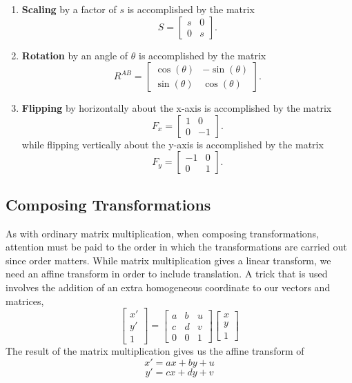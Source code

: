 \documentclass[11pt]{article}
\theoremstyle{plain} %
\theoremstyle{definition}
\theoremstyle{example}
\theoremstyle{remark}
\begin{document}
\begin{enumerate}
	\item \textbf{Scaling} by a factor of $s$ is accomplished by the matrix $$S = \begin{bmatrix}s & 0 \\ 0 & s\end{bmatrix}.$$
	\item \textbf{Rotation} by an angle of $\theta$ is accomplished by the matrix $$R^{AB} = \begin{bmatrix}\cos(\theta) & -\sin(\theta)\\ \sin(\theta) & \cos(\theta)\end{bmatrix}.$$
	\item \textbf{Flipping} by horizontally about the x-axis is accomplished by the matrix $$F_x = \begin{bmatrix}1 & 0 \\ 0 & -1\end{bmatrix}.$$ while flipping vertically about the y-axis is accomplished by the matrix $$F_y =  \begin{bmatrix}-1 & 0 \\ 0 & 1\end{bmatrix}.$$ 
\end{enumerate}

\subsection{Composing Transformations}

As with ordinary matrix multiplication, when composing transformations, attention must be paid to the order in which the transformations are carried out since order matters. While matrix multiplication gives a linear transform, we need an affine transform in order to include translation. A trick that is used involves the addition of an extra homogeneous coordinate to our vectors and matrices, 
$$\begin{bmatrix}x' \\ y' \\ 1\end{bmatrix} = \begin{bmatrix}a & b & u \\ c & d & v \\ 0 & 0 & 1\end{bmatrix}\begin{bmatrix}x \\ y \\ 1 \end{bmatrix}$$
The result of the matrix multiplication gives us the affine transform of 
$$x' = ax + by + u$$
$$y' = cx + dy + v$$
\end{document}
